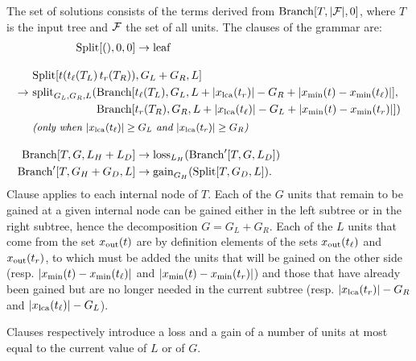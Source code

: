 The set of solutions consists of the terms derived from \(\mathrm{Branch}[T, |\mathcal{F}|, 0]\), where \(T\) is the input tree and \(\mathcal{F}\) the set of all units.
The clauses of the grammar are:
{\allowdisplaybreaks
\begin{subequations}
\begin{align}
    \gSplit[(), 0, 0] &\rightarrow \evLeaf \label{eq:adp-rec:set-split-leaf} \\[2ex]
    \begin{aligned}
        &\gSplit[t(t\lchild(T_L)\,t\rchild(T_R)), G_L + G_R, L] \\
        \rightarrow\ & \evSplit_{G_L, G_R, L}(
            \begin{aligned}[t]
                &\gBranch[t\lchild(T_L), G_L, L + |\xlca(t\rchild)| - G_R + |\xmin(t) - \xmin(t\lchild)|], \\
                &\gBranch[t\rchild(T_R), G_R, L + |\xlca(t\lchild)| - G_L + |\xmin(t) - \xmin(t\rchild)|])
            \end{aligned} \\
        &\text{\itshape\small (only when \(|\xlca(t\lchild)| \ge G_L\) and \(|\xlca(t\rchild)| \ge G_R\))}
    \end{aligned} \span \label{eq:adp-rec:set-split-inner}\\[2ex]
    \gBranch[T, G, L_H + L_D] &\rightarrow \evLoss_{L_H}(\gBranch'[T, G, L_D]) \label{eq:adp-rec:set-split-loss}\\
    \gBranch'[T, G_H + G_D, L] &\rightarrow \evGain_{G_H}(\gSplit[T, G_D, L]). \label{eq:adp-rec:set-split-gain}
\end{align}
\end{subequations}}%
Clause  applies to each internal node of \(T\).
Each of the \(G\) units that remain to be gained at a given internal node can be gained either in the left subtree or in the right subtree, hence the decomposition \(G = G_L + G_R\).
Each of the \(L\) units that come from the set \(x_{\mathrm{out}}(t)\) are by definition elements of the sets \(x_{\mathrm{out}}(t_\mathit{\ell})\) and \(x_{\mathrm{out}}(t_r)\), to which must be added the units that will be gained on the other side (resp. \(|x_{\mathrm{min}}(t) - x_{\mathrm{min}}(t_\mathit{\ell})|\) and \(|x_{\mathrm{min}}(t) - x_{\mathrm{min}}(t_r)|\)) and those that have already been gained but are no longer needed in the current subtree (resp. \(|x_{\mathrm{lca}}(t_r)| - G_R\) and \(|x_{\mathrm{lca}}(t_\mathit{\ell})| - G_L\)).

Clauses  respectively introduce a loss and a gain of a number of units at most equal to the current value of \(L\) or of \(G\).

